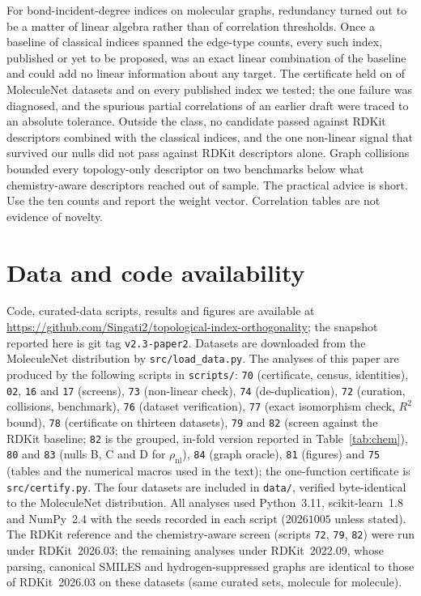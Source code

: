 \documentclass[11pt,a4paper]{article}
\theoremstyle{definition}
\begin{document}
For bond-incident-degree indices on molecular graphs, redundancy
turned out to be a matter of linear algebra rather than of correlation
thresholds. Once a baseline of classical indices spanned the edge-type
counts, every such index, published or yet to be proposed, was an
exact linear combination of the baseline and could add no linear
information about any target. The certificate held on \nGenCertified{}
of \nGenDatasets{} MoleculeNet datasets and on every published index we
tested; the one failure was diagnosed, and the spurious partial
correlations of an earlier draft were traced to an absolute tolerance.
Outside the class, no candidate passed against RDKit descriptors
combined with the classical indices, and the one non-linear signal
that survived our nulls did not pass against RDKit descriptors
alone. Graph collisions bounded
every topology-only descriptor on two benchmarks below what
chemistry-aware descriptors reached out of sample. The practical
advice is short. Use the ten counts and report the weight vector.
Correlation tables are not evidence of novelty.

\section*{Data and code availability}

Code, curated-data scripts, results and figures are available at
\url{https://github.com/Singati2/topological-index-orthogonality};
the snapshot reported here is git tag \texttt{v2.3-paper2}. Datasets
are downloaded from the MoleculeNet distribution by
\texttt{src/load\_data.py}. The analyses of this paper are produced
by the following scripts in \texttt{scripts/}: \texttt{70} (certificate,
census, identities), \texttt{02}, \texttt{16} and \texttt{17} (screens),
\texttt{73} (non-linear check), \texttt{74} (de-duplication),
\texttt{72} (curation, collisions, benchmark), \texttt{76} (dataset
verification), \texttt{77} (exact isomorphism check, $R^2$ bound),
\texttt{78} (certificate on thirteen datasets), \texttt{79} and
\texttt{82} (screen against the RDKit baseline; \texttt{82} is the
grouped, in-fold version reported in Table~\ref{tab:chem}),
\texttt{80} and \texttt{83} (nulls B, C and D for
$\rho_{\mathrm{nl}}$), \texttt{84} (graph oracle), \texttt{81}
(figures) and \texttt{75} (tables and the numerical macros used in the
text); the one-function certificate is \texttt{src/certify.py}. The four datasets are included in \texttt{data/},
verified byte-identical to the MoleculeNet distribution. All analyses
used Python~3.11, scikit-learn~1.8 and NumPy~2.4 with the seeds
recorded in each script ($20261005$ unless stated). The RDKit
reference and the chemistry-aware screen (scripts \texttt{72},
\texttt{79}, \texttt{82}) were run under RDKit~2026.03; the
remaining analyses under RDKit~2022.09, whose parsing, canonical
SMILES and hydrogen-suppressed graphs are identical to those of
RDKit~2026.03 on these datasets (same curated sets, molecule for
molecule).
\end{document}
